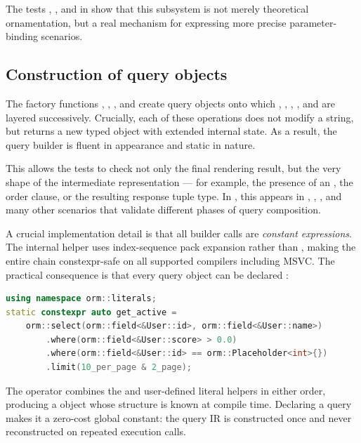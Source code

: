 The tests , , and  in  show that this subsystem is not merely theoretical ornamentation, but a real mechanism for expressing more precise parameter-binding scenarios.

\subsection{Construction of query objects}

The factory functions , , , and  create query objects onto which , , , , and  are layered successively. Crucially, each of these operations does not modify a string, but returns a new typed object with extended internal state. As a result, the query builder is fluent in appearance and static in nature.

This allows the tests to check not only the final rendering result, but the very shape of the intermediate representation --- for example, the presence of an , the order clause, or the resulting response tuple type. In , this appears in , , , and many other scenarios that validate different phases of query composition.

A crucial implementation detail is that all builder calls are \emph{constant expressions}. The internal  helper uses index-sequence pack expansion rather than , making the entire chain constexpr-safe on all supported compilers including MSVC. The practical consequence is that every query object can be declared :

\begin{lstlisting}[language=C++,caption={Query object declared as a compile-time constant},label={lst:constexpr_query}]
using namespace orm::literals;
static constexpr auto get_active =
    orm::select(orm::field<&User::id>, orm::field<&User::name>)
        .where(orm::field<&User::score> > 0.0)
        .where(orm::field<&User::id> == orm::Placeholder<int>{})
        .limit(10_per_page & 2_page);
\end{lstlisting}

The \code{\&} operator combines the  and  user-defined literal helpers in either order, producing a  object whose structure is known at compile time. Declaring a query  makes it a zero-cost global constant: the query IR is constructed once and never reconstructed on repeated execution calls.

